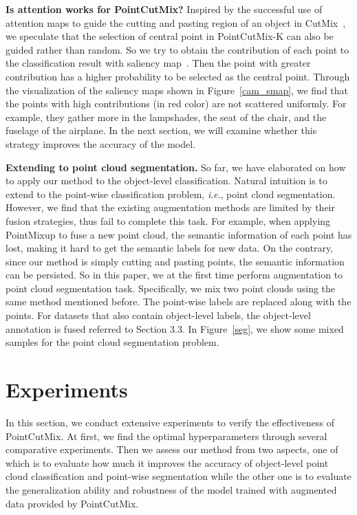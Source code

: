 \documentclass{article}
\newcommand{\ie}{\textit{i}.\textit{e}.}
\begin{document}
\textbf{Is attention works for PointCutMix?}
Inspired by the successful use of attention maps to guide the cutting and pasting region of an object in CutMix~\cite{walawalkar2020attentive}, we speculate that the selection of central point  in PointCutMix-K can also be guided rather than random. 
So we try to obtain the contribution of each point to the classification result with saliency map~\cite{pointcloudsaliencymaps}. 
Then the point with greater contribution has a higher probability to be selected as the central point. Through the visualization of the saliency maps shown in Figure~\ref{cam_smap}, we find that the points with high contributions (in red color) are not scattered uniformly. For example, they gather more in the lampshades, the seat of the chair, and the fuselage of the airplane. In the next section, we will examine whether this strategy improves the accuracy of the model.



\textbf{Extending to point cloud segmentation.} 
So far, we have elaborated on how to apply our method to the object-level classification. Natural intuition is to extend to the point-wise classification problem, \ie, point cloud segmentation. However, we find that the existing augmentation methods are limited by their fusion strategies, thus fail to complete this task. For example, when applying PointMixup to fuse a new point cloud, the semantic information of each point has lost, making it hard to get the semantic labels for new data. 
On the contrary, since our method is simply cutting and pasting points, the semantic information can be persisted. So in this paper, we at the first time perform augmentation to point cloud segmentation task. Specifically, we mix two point clouds using the same method mentioned before. The point-wise labels are replaced along with the points. For datasets that also contain object-level labels, the object-level annotation is fused referred to Section 3.3. In Figure~\ref{seg}, we show some mixed samples for the point cloud segmentation problem.











\section{Experiments}

In this section, we conduct extensive experiments to verify the effectiveness of PointCutMix. At first, we find the optimal hyperparameters through several comparative experiments. Then we assess our method from two aspects, one of which is to evaluate how much it improves the accuracy of object-level point cloud classification and point-wise segmentation while the other one is to evaluate the generalization ability and robustness of the model trained with augmented data provided by PointCutMix.
\end{document}
